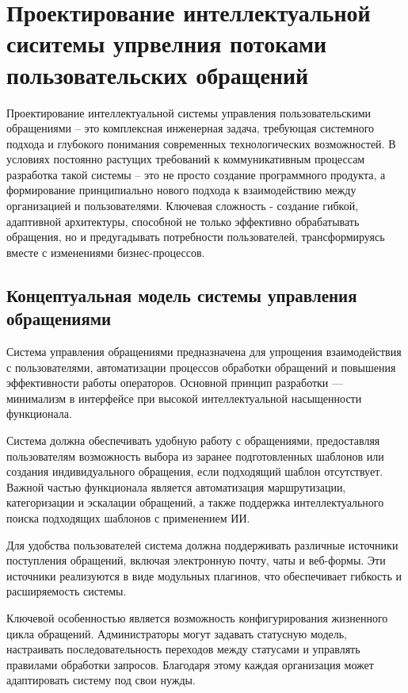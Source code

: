 \section{Проектирование интеллектуальной сиситемы упрвелния потоками пользовательских обращений}
\label{sec:designing}

Проектирование интеллектуальной системы управления пользовательскими обращениями – это комплексная инженерная задача, требующая системного подхода и глубокого понимания современных технологических возможностей. В условиях постоянно растущих требований к коммуникативным процессам разработка такой системы – это не просто создание программного продукта, а формирование принципиально нового подхода к взаимодействию между организацией и пользователями. Ключевая сложность - создание гибкой, адаптивной архитектуры, способной не только эффективно обрабатывать обращения, но и предугадывать потребности пользователей, трансформируясь вместе с изменениями бизнес-процессов.

\subsection{Концептуальная модель системы управления обращениями}

Система управления обращениями предназначена для упрощения взаимодействия с пользователями, автоматизации процессов обработки обращений и повышения эффективности работы операторов. Основной принцип разработки — минимализм в интерфейсе при высокой интеллектуальной насыщенности функционала.

Система должна обеспечивать удобную работу с обращениями, предоставляя пользователям возможность выбора из заранее подготовленных шаблонов или создания индивидуального обращения, если подходящий шаблон отсутствует. Важной частью функционала является автоматизация маршрутизации, категоризации и эскалации обращений, а также поддержка интеллектуального поиска подходящих шаблонов с применением ИИ.

Для удобства пользователей система должна поддерживать различные источники поступления обращений, включая электронную почту, чаты и веб-формы. Эти источники реализуются в виде модульных плагинов, что обеспечивает гибкость и расширяемость системы.

Ключевой особенностью является возможность конфигурирования жизненного цикла обращений. Администраторы могут задавать статусную модель, настраивать последовательность переходов между статусами и управлять правилами обработки запросов. Благодаря этому каждая организация может адаптировать систему под свои нужды.

